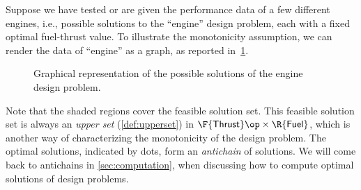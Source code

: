 \begin{example}
Suppose we have tested or are given the performance data of a few different engines, i.e., possible solutions to the ``engine'' design problem, each with a fixed optimal fuel-thrust value. To illustrate the monotonicity assumption, we can render the data of ``engine'' as a graph, as reported in~\cref{fig:solenginedp}.
\begin{figure}[h!]
\begin{center}
\end{center}
\caption{Graphical representation of the possible solutions of the engine design problem. \label{fig:solenginedp}}
\end{figure}

Note that the shaded regions cover the feasible solution set. This feasible solution set is always an \emph{upper set} (\cref{def:upperset}) in $\F{\mathsf{Thrust}}\op \times \R{\mathsf{Fuel}}$, which is another way of characterizing the monotonicity of the design problem. The optimal solutions, indicated by dots, form an \emph{antichain} of solutions. We will come back to antichains in \cref{sec:computation}, when discussing how to compute optimal solutions of design problems.
\end{example}



